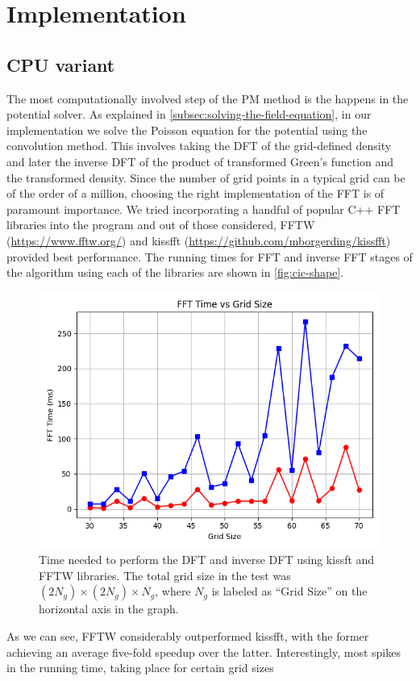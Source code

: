 \section{Implementation}
\subsection{CPU variant}
The most computationally involved step of the PM method is the happens in the potential solver.
As explained in \autoref{subsec:solving-the-field-equation}, in our implementation we solve the Poisson equation for the potential using the convolution method.
This involves taking the DFT of the grid-defined density and later the inverse DFT of the product of transformed Green's function and the transformed density.
Since the number of grid points in a typical grid can be of the order of a million, choosing the right implementation of the FFT is of paramount importance.
We tried incorporating a handful of popular C++ FFT libraries into the program and out of those considered, FFTW (\url{https://www.fftw.org/}) and kissfft (\url{https://github.com/mborgerding/kissfft}) provided best performance.
The running times for FFT and inverse FFT stages of the algorithm using each of the libraries are shown in \autoref{fig:cic-shape}.
\begin{figure}[htp]
    \centering
    \includegraphics[scale=0.5]{img/fft_time.png}
    \caption{Time needed to perform the DFT and inverse DFT using kissft and FFTW libraries.
        The total grid size in the test was $(2N_g)\times (2N_g) \times N_g$, where $N_g$ is labeled as ``Grid Size'' on the horizontal axis in the graph.}
    \label{fig:fft-time}
\end{figure}
As we can see, FFTW considerably outperformed kissfft, with the former achieving an average five-fold speedup over the latter.
Interestingly, most spikes in the running time, taking place for certain grid sizes

